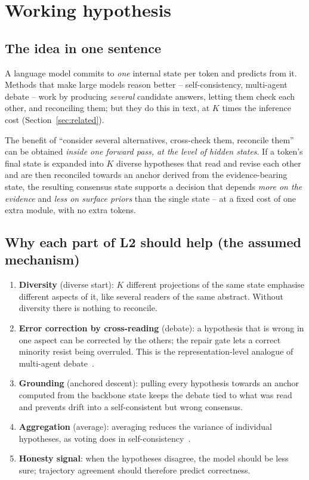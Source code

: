 \documentclass[a4paper,11pt,parskip=half]{scrartcl}
\begin{document}
\section{Working hypothesis}
\label{sec:hypothesis}

\subsection{The idea in one sentence}

A language model commits to \emph{one} internal state per token and predicts
from it. Methods that make large models reason better -- self-consistency,
multi-agent debate -- work by producing \emph{several} candidate answers,
letting them check each other, and reconciling them; but they do this in
text, at $K$ times the inference cost (Section~\ref{sec:related}).

\begin{keybox}[title={Working hypothesis (H)}]
The benefit of ``consider several alternatives, cross-check them, reconcile
them'' can be obtained \emph{inside one forward pass, at the level of hidden
states}. If a token's final state is expanded into $K$ diverse hypotheses that
read and revise each other and are then reconciled towards an anchor derived
from the evidence-bearing state, the resulting consensus state supports a
decision that depends \emph{more on the evidence} and \emph{less on surface
priors} than the single state -- at a fixed cost of one extra module, with no
extra tokens.
\end{keybox}

\subsection{Why each part of L2 should help (the assumed mechanism)}

\begin{enumerate}
  \item \textbf{Diversity} (diverse start): $K$ different projections of the same
  state emphasise different aspects of it, like several readers of the same
  abstract. Without diversity there is nothing to reconcile.
  \item \textbf{Error correction by cross-reading} (debate): a hypothesis that
  is wrong in one aspect can be corrected by the others; the repair gate lets a
  correct minority resist being overruled. This is the representation-level
  analogue of multi-agent debate~\cite{du2023debate}.
  \item \textbf{Grounding} (anchored descent): pulling every hypothesis towards
  an anchor computed from the backbone state keeps the debate tied to what was
  read and prevents drift into a self-consistent but wrong consensus.
  \item \textbf{Aggregation} (average): averaging reduces the variance of
  individual hypotheses, as voting does in self-consistency~\cite{wang2023sc}.
  \item \textbf{Honesty signal}: when the hypotheses disagree, the model should
  be less sure; trajectory agreement should therefore predict correctness.
\end{enumerate}
\end{document}
